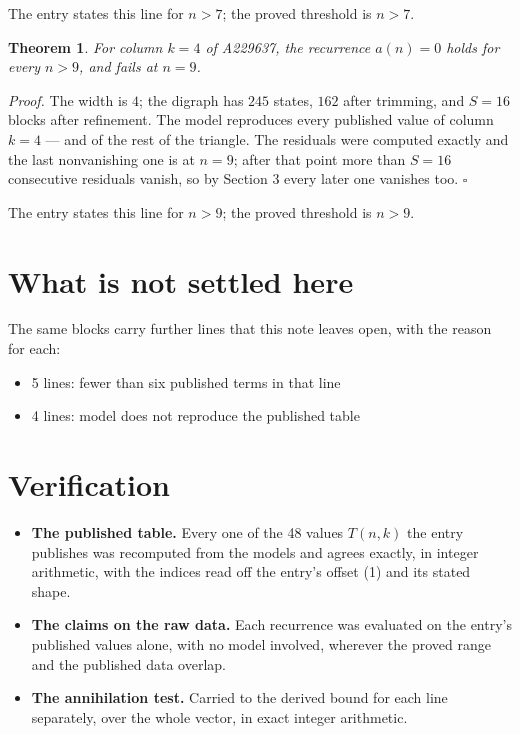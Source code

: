 \documentclass[11pt]{article}
\newtheorem{theorem}{Theorem}
\theoremstyle{definition}
\begin{document}
The entry states this line for $n > 7$; the proved threshold is $n > 7$.

\begin{theorem} For column $k = 4$ of A229637, the recurrence $a(n) = 0$ holds for every $n > 9$, and fails at $n = 9$.\end{theorem}

{\itshape Proof.} The width is $4$; the digraph has $245$ states, $162$ after trimming, and $S = 16$ blocks after refinement. The model reproduces every published value of column $k = 4$ --- and of the rest of the triangle. The residuals were computed exactly and the last nonvanishing one is at $n = 9$; after that point more than $S = 16$ consecutive residuals vanish, so by Section 3 every later one vanishes too. $\square$

The entry states this line for $n > 9$; the proved threshold is $n > 9$.

\section{What is not settled here}

The same blocks carry further lines that this note leaves open, with the reason for each:

\begin{itemize}

\item 5 lines: fewer than six published terms in that line

\item 4 lines: model does not reproduce the published table

\end{itemize}

\section{Verification}

\begin{itemize}

\item {\bfseries The published table.} Every one of the 48 values $T(n,k)$ the entry publishes was recomputed from the models and agrees exactly, in integer arithmetic, with the indices read off the entry's offset (1) and its stated shape.

\item {\bfseries The claims on the raw data.} Each recurrence was evaluated on the entry's published values alone, with no model involved, wherever the proved range and the published data overlap.

\item {\bfseries The annihilation test.} Carried to the derived bound for each line separately, over the whole vector, in exact integer arithmetic.

\end{itemize}
\end{document}
